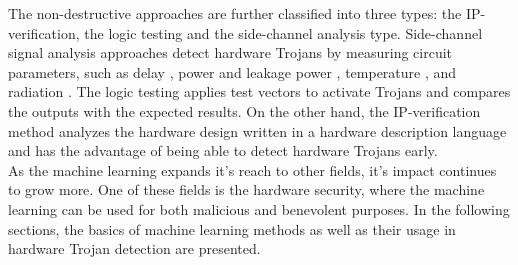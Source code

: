 The non-destructive approaches are further classified into three types: the IP-verification, the logic testing and the side-channel analysis type. Side-channel signal analysis approaches detect hardware Trojans by measuring circuit parameters, such as delay \cite{jin2008hardware},
power \cite{agrawal2007trojan} and leakage power \cite{aarestad2010detecting},
temperature \cite{forte2013temperature}, and radiation \cite{stellari2014verification}. The logic testing applies test vectors to activate Trojans and compares the outputs with the expected results. On the other hand, the IP-verification method analyzes the hardware design written in a hardware description language and has the advantage of being able to detect hardware Trojans early. \\
As the machine learning expands it's reach to other fields, it's impact continues to grow more. One of these fields is the hardware security, where the machine learning can be used for both malicious and benevolent purposes. In the following sections, the basics of machine learning methods as well as their usage in hardware Trojan detection are presented.